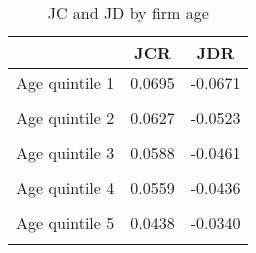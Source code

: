 \begin{table}[htbp]\centering
\caption{JC and JD by firm age}
\begin{tabular}{l*{2}{c}}
\hline\hline
                    &\multicolumn{1}{c}{JCR}&\multicolumn{1}{c}{JDR}\\
\hline
Age quintile 1      &      0.0695&     -0.0671\\
                    &            &            \\
[1em]
Age quintile 2      &      0.0627&     -0.0523\\
                    &            &            \\
[1em]
Age quintile 3      &      0.0588&     -0.0461\\
                    &            &            \\
[1em]
Age quintile 4      &      0.0559&     -0.0436\\
                    &            &            \\
[1em]
Age quintile 5      &      0.0438&     -0.0340\\
                    &            &            \\
\hline\hline
\end{tabular}
\end{table}
